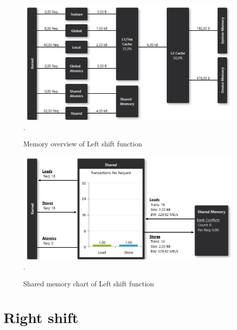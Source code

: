 \documentclass[oneside,openright,12pt,final,en]{mgr}
\begin{document}
\begin{figure}[H]
	\centering
	\includegraphics[width=\textwidth]{leftshift_memory}.
	\caption{Memory overview of Left shift function}
	\label{fig:leftshift_memory}
\end{figure}

\begin{figure}[H]
	\centering
	\includegraphics[width=\textwidth]{leftshift_shared}.
	\caption{Shared memory chart of Left shift function}
	\label{fig:leftshift_shared}
\end{figure}

\section{Right shift}
\end{document}
